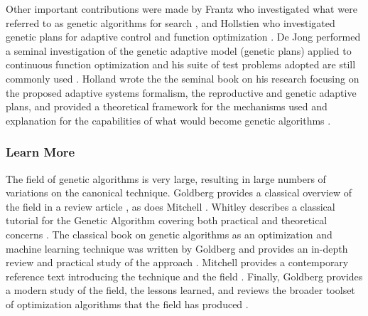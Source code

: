 Other important contributions were made by Frantz who investigated what were referred to as genetic algorithms for search \cite{Frantz1972}, and Hollstien who investigated genetic plans for adaptive control and function optimization \cite{Hollstien1971}.
De Jong performed a seminal investigation of the genetic adaptive model (genetic plans) applied to continuous function optimization and his suite of test problems adopted are still commonly used \cite{Jong1975}.
Holland wrote the the seminal book on his research focusing on the proposed adaptive systems formalism, the reproductive and genetic adaptive plans, and provided a theoretical framework for the mechanisms used and explanation for the capabilities of what would become genetic algorithms \cite{Holland1975}.


% 
% 
\subsubsection{Learn More}
The field of genetic algorithms is very large, resulting in large numbers of variations on the canonical technique.
Goldberg provides a classical overview of the field in a review article \cite{Goldberg1994}, as does Mitchell \cite{Mitchell1995}.
Whitley describes a classical tutorial for the Genetic Algorithm covering both practical and theoretical concerns \cite{Whitley1994}.
The classical book on genetic algorithms as an optimization and machine learning technique was written by Goldberg and provides an in-depth review and practical study of the approach \cite{Goldberg1989}. Mitchell provides a contemporary reference text introducing the technique and the field \cite{Mitchell1998}. Finally, Goldberg provides a modern study of the field, the lessons learned, and reviews the broader toolset of optimization algorithms that the field has produced \cite{Goldberg2002}.


